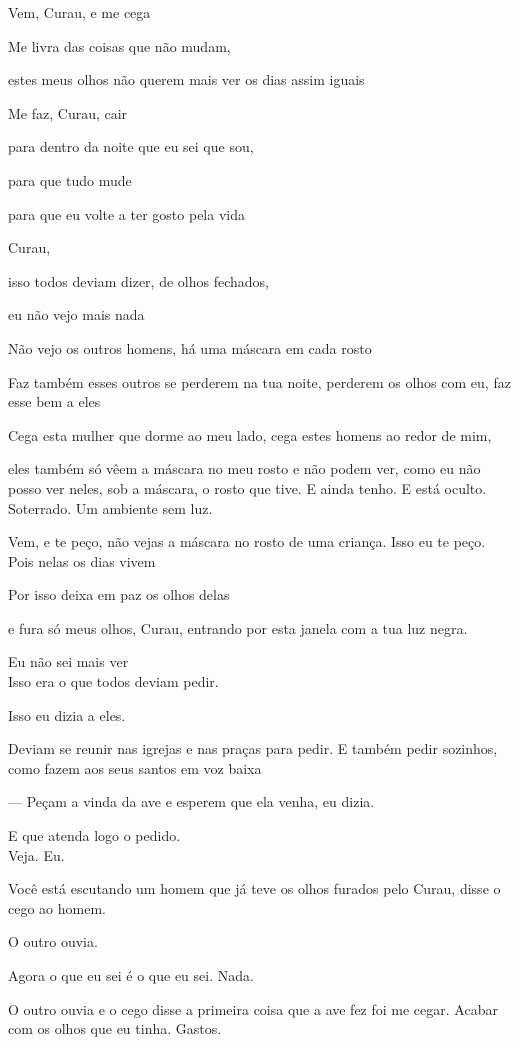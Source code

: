 Vem, Curau, e me cega

Me livra das coisas que não mudam,

estes meus olhos não querem mais ver os dias assim iguais

Me faz, Curau, cair

para dentro da noite que eu sei que sou,

para que tudo mude

para que eu volte a ter gosto pela vida

Curau,

isso todos deviam dizer, de olhos fechados,

eu não vejo mais nada

Não vejo os outros homens, há uma máscara em cada rosto

Faz também esses outros se perderem na tua noite, perderem os olhos com
eu, faz esse bem a eles

Cega esta mulher que dorme ao meu lado, cega estes homens ao redor de
mim,

eles também só vêem a máscara no meu rosto e não podem ver, como eu não
posso ver neles, sob a máscara, o rosto que tive. E ainda tenho. E está
oculto. Soterrado. Um ambiente sem luz.

Vem, e te peço, não vejas a máscara no rosto de uma criança. Isso eu te
peço. Pois nelas os dias vivem

Por isso deixa em paz os olhos delas

e fura só meus olhos, Curau, entrando por esta janela com a tua luz
negra.

Eu não sei mais ver\\

Isso era o que todos deviam pedir.

Isso eu dizia a eles.

Deviam se reunir nas igrejas e nas praças para pedir. E também pedir
sozinhos, como fazem aos seus santos em voz baixa

--- Peçam a vinda da ave e esperem que ela venha, eu dizia.

E que atenda logo o pedido.\\

Veja. Eu.

Você está escutando um homem que já teve os olhos furados pelo Curau,
disse o cego ao homem.

O outro ouvia.

Agora o que eu sei é o que eu sei. Nada.

O outro ouvia e o cego disse a primeira coisa que a ave fez foi me
cegar. Acabar com os olhos que eu tinha. Gastos.

